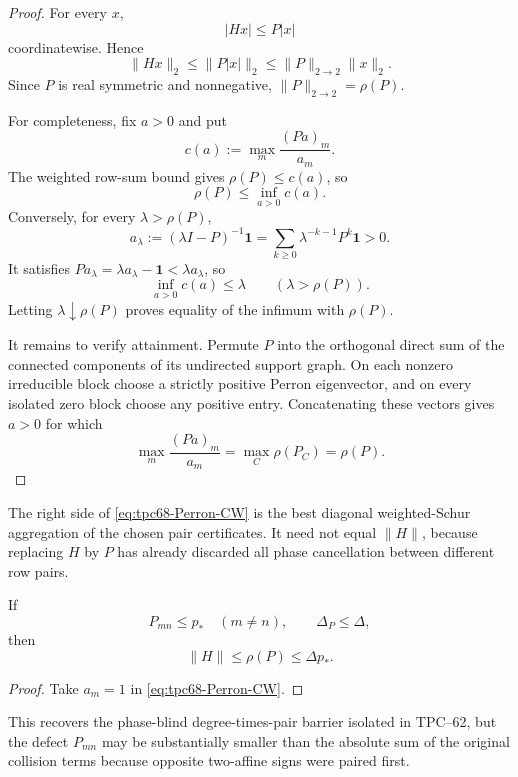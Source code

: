 \begin{proof}
For every \(x\),
\[
 |Hx|\le P|x|
\]
coordinatewise.  Hence
\[
 \|Hx\|_2\le\|P|x|\|_2
 \le\|P\|_{2\to2}\|x\|_2.
\]
Since \(P\) is real symmetric and nonnegative,
\(\|P\|_{2\to2}=\rho(P)\).

For completeness, fix \(a>0\) and put
\[
 c(a):=\max_m\frac{(Pa)_m}{a_m}.
\]
The weighted row-sum bound gives \(\rho(P)\le c(a)\), so
\[
 \rho(P)\le\inf_{a>0}c(a).
\]
Conversely, for every
\(\lambda>\rho(P)\),
\[
 a_\lambda:=(\lambda I-P)^{-1}\mathbf1
 =\sum_{k\ge0}\lambda^{-k-1}P^k\mathbf1
 >0.
\]
It satisfies \(Pa_\lambda=\lambda a_\lambda-\mathbf1<\lambda a_\lambda\),
so
\[
 \inf_{a>0}c(a)\le\lambda
 \qquad(\lambda>\rho(P)).
\]
Letting \(\lambda\downarrow\rho(P)\) proves equality of the infimum with
\(\rho(P)\).

It remains to verify attainment.  Permute \(P\) into the orthogonal direct
sum of the connected components of its undirected support graph.  On each
nonzero irreducible block choose a strictly positive Perron eigenvector,
and on every isolated zero block choose any positive entry.  Concatenating
these vectors gives \(a>0\) for which
\[
 \max_m\frac{(Pa)_m}{a_m}
 =\max_C\rho(P_C)=\rho(P).
\]
\end{proof}

\begin{remark}
The right side of \eqref{eq:tpc68-Perron-CW} is the best diagonal
weighted-Schur aggregation of the chosen pair certificates.  It need not
equal \(\|H\|\), because replacing \(H\) by \(P\) has already discarded
all phase cancellation between different row pairs.
\end{remark}

\begin{corollary}
\label{cor:tpc68-pair-degree}
If
\[
 P_{mn}\le p_*
 \quad(m\ne n),
 \qquad
 \Delta_P\le\Delta,
\]
then
\begin{equation}
 \|H\|\le\rho(P)\le\Delta p_*.
 \label{eq:tpc68-pair-degree-bound}
\end{equation}
\end{corollary}

\begin{proof}
Take \(a_m=1\) in \eqref{eq:tpc68-Perron-CW}.
\end{proof}

This recovers the phase-blind degree-times-pair barrier isolated in
TPC--62, but the defect \(P_{mn}\) may be substantially smaller than the
absolute sum of the original collision terms because opposite two-affine
signs were paired first.
